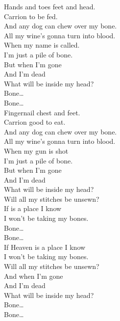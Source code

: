 


Hands and toes feet and head. \\
Carrion to be fed. \\
And any dog can chew over my bone. \\
All my wine's gonna turn into blood. \\
When my name is called. \\
I'm just a pile of bone. \\

But when I'm gone \\
And I'm dead \\
What will be inside my head? \\

Bone… \\
Bone… \\

Fingernail chest and feet. \\
Carrion good to eat. \\
And any dog can chew over my bone. \\
All my wine's gonna turn into blood. \\
When my gun is shot \\
I'm just a pile of bone. \\

But when I'm gone \\
And I'm dead \\
What will be inside my head? \\
Will all my stitches be unsewn? \\
If  is a place I know \\
I won't be taking my bones. \\

Bone… \\
Bone… \\

If Heaven is a place I know \\
I won't be taking my bones. \\
Will all my stitches be unsewn? \\
And when I'm gone \\
And I'm dead \\
What will be inside my head? \\

Bone… \\
Bone… \\

